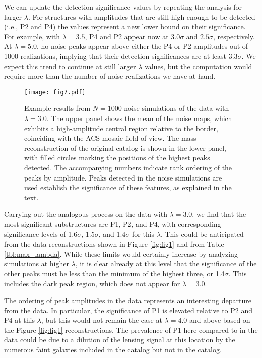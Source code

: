 \documentclass[iop,twocolappendix]{emulateapj}
\newcommand{\cta}[1]{\citetalias{#1}}
\begin{document}
We can update the detection significance values by repeating the analysis for larger $\lambda$.
For structures with amplitudes that are still high enough to be detected (i.e., P2 and P4) the values 
represent a new lower bound on their significance. For example, with $\lambda=3.5$, P4 and P2 appear now at
$3.0\sigma$ and $2.5\sigma$, respectively. At $\lambda=5.0$, no noise peaks appear above either the P4 or P2 
amplitudes out of 1000 realizations, implying that their detection significances are at least $3.3\sigma$. We
expect this trend to continue at still larger $\lambda$ values, but the computation would require more than
the number of noise realizations we have at hand.

\begin{figure}
\centering
\texttt{[image: fig7.pdf]}
\caption{Example results from $N=1000$ noise simulations of the \cta{J14} data with $\lambda=3.0$.
         The upper panel shows the mean of the noise maps, which exhibits a high-amplitude central
         region relative to the border, coinciding with the ACS mosaic field of view. The mass reconstruction
         of the original catalog is shown in the lower panel, with filled circles marking the positions of 
         the highest peaks detected. The accompanying numbers indicate rank ordering of the peaks by amplitude.
         Peaks detected in the noise simulations are used establish the significance of these features, as
         explained in the text.}
\label{fig:J14noise}
\end{figure}

Carrying out the analogous process on the \cta{C12} data with $\lambda=3.0$, we find that the most significant
substructures are P1, P2, and P4, with corresponding significance levels of 1.6$\sigma$, 1.5$\sigma$, and
1.4$\sigma$ for this $\lambda$.
This could be anticipated from the data reconstructions shown in Figure \ref{fig:fig1} and from Table
\ref{tbl:max_lambda}. While these limits would certainly increase by analyzing simulations at higher $\lambda$,
it is clear already at this level that the significance of the other peaks must be less than the minimum of 
the highest three, or 1.4$\sigma$. This includes the dark peak region, which does not appear 
for $\lambda=3.0$. 

The ordering of peak amplitudes in the \cta{C12} data represents an interesting departure
from the \cta{J14} data. In particular, the significance of P1 is elevated relative to P2 and P4 at this
$\lambda$, but this would not remain the case at $\lambda=4.0$ and above based on the Figure \ref{fig:fig1}
reconstructions. The prevalence of P1 here compared to in the \cta{J14} data could be due to a dilution of the 
lensing signal at this location by the numerous faint galaxies included in the \cta{J14} catalog but not in 
the \cta{C12} catalog.
\end{document}

